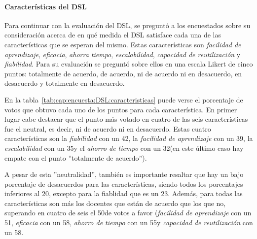 \paragraph{Características del DSL}

Para continuar con la evaluación del DSL, se preguntó a los encuestados sobre su consideración acerca de en qué medida el DSL satisface cada una de las características que se esperan del mismo. Estas características son \emph{facilidad de aprendizaje}, \emph{eficacia}, \emph{ahorra tiempo}, \emph{escalabilidad}, \emph{capacidad de reutilización} y \emph{fiabilidad}. Para su evaluación se preguntó sobre ellos en una escala Likert de cinco puntos: totalmente de acuerdo, de acuerdo, ni de acuerdo ni en desacuerdo, en desacuerdo y totalmente en desacuerdo. 

En la tabla~\ref{tab:cap:encuesta:DSL:caracteristicas} puede verse el porcentaje de votos que obtuvo cada uno de los puntos para cada característica. En primer lugar cabe destacar que el punto más votado en cuatro de las seis características fue el neutral, es decir, ni de acuerdo ni en desacuerdo. Estas cuatro características son la \emph{fiabilidad} con un 42\percentage, la \emph{facilidad de aprendizaje} con un 39\percentage, la \emph{escalabilidad} con un 35\percentage y el \emph{ahorro de tiempo} con un 32\percentage (en este último caso hay empate con el punto ''totalmente de acuerdo'').

A pesar de esta ''neutralidad'', también es importante resaltar que hay un bajo porcentaje de desacuerdos para las características, siendo todos los porcentajes inferiores al 20\percentage, excepto para la fiablidad que es un 23\percentage. Además, para todas las características son más los docentes que están de acuerdo que los que no, superando en cuatro de seis el 50\percentage de votos a favor (\emph{facilidad de aprendizaje} con un 51\percentage, \emph{eficacia} con un 58\percentage, \emph{ahorro de tiempo} con un 55\percentage y \emph{capacidad de reutilización} con un 58\percentage.

